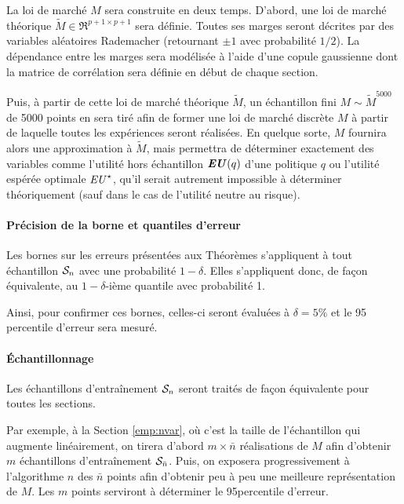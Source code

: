 La loi de marché $M$ sera construite en deux temps. D'abord, une loi de marché théorique
$\tilde M \in \Re^{p+1 \times p+1}$ sera définie. Toutes ses marges seront décrites par des
variables aléatoires Rademacher (retournant $\pm 1$ avec probabilité $1/2$). La dépendance
entre les marges sera modélisée à l'aide d'une copule gaussienne dont la matrice de
corrélation sera définie en début de chaque section.

Puis, à partir de cette loi de marché théorique $\tilde M$, un échantillon fini
$M \sim \tilde M^{\num{5000}}$ de \num{5000} points en sera tiré afin de former une loi de
marché discrète $M$ à partir de laquelle toutes les expériences seront réalisées. En
quelque sorte, $M$ fournira alors une approximation à $\tilde M$, mais permettra de
déterminer exactement des variables comme l'utilité hors échantillon $\EU(q)$ d'une
politique $q$ ou l'utilité espérée optimale $\nEU^\star$, qu'il serait autrement impossible à
déterminer théoriquement (sauf dans le cas de l'utilité neutre au risque).


\paragraph{Précision de la borne et quantiles d'erreur}

Les bornes sur les erreurs présentées aux Théorèmes \cit s'appliquent à tout échantillon
$\S_n$ avec une probabilité $1-\delta$. Elles s'appliquent donc, de façon équivalente, au
$1-\delta$-ième quantile avec probabilité 1.

Ainsi, pour confirmer ces bornes, celles-ci seront évaluées à $\delta = 5\%$ et le 95\ieme
percentile d'erreur sera mesuré.

\paragraph{Échantillonnage}

Les échantillons d'entraînement $\S_n$ seront traités de façon équivalente pour toutes les
sections.

Par exemple, à la Section \ref{emp:nvar}, où c'est la taille de l'échantillon qui augmente
linéairement, on tirera d'abord $m \times \bar n$ réalisations de $M$ afin d'obtenir $m$
échantillons d'entraînement $\S_{\bar n}$. Puis, on exposera progressivement à
l'algorithme $n$ des $\bar n$ points afin d'obtenir peu à peu une meilleure représentation
de $M$. Les $m$ points serviront à déterminer le 95\ieme percentile d'erreur.

